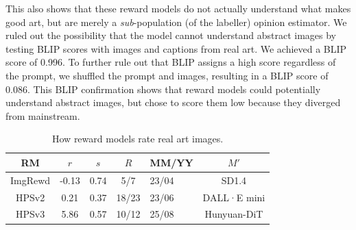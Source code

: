 This also shows that these reward models do not actually understand what makes good art, but are merely a \textit{sub}-population (of the labeller) opinion estimator. We ruled out the possibility that the model cannot understand abstract images by testing BLIP scores with images and captions from real art. We achieved a BLIP score of 0.996. To further rule out that BLIP assigns a high score regardless of the prompt, we shuffled the prompt and images, resulting in a BLIP score of 0.086. This BLIP confirmation shows that reward models could potentially understand abstract images, but chose to score them low because they diverged from mainstream. 
\begin{table}[]
    \centering
    \small
    \begin{tabular}{c|ccclc}
    \toprule
      RM & $r$ & $s$ & $R$ &  MM/YY &$M'$ \\ \midrule
      ImgRewd & -0.13 & 0.74 & 5/7&  23/04 &SD1.4\\
 HPSv2& 0.21& 0.37& 18/23&  23/06&DALL·E mini\\
 HPSv3& 5.86& 0.57& 10/12&  25/08&Hunyuan-DiT\\
 \bottomrule
    \end{tabular}
    \caption{How reward models rate real art images.}
    \label{tab:real_arts}
\end{table}
